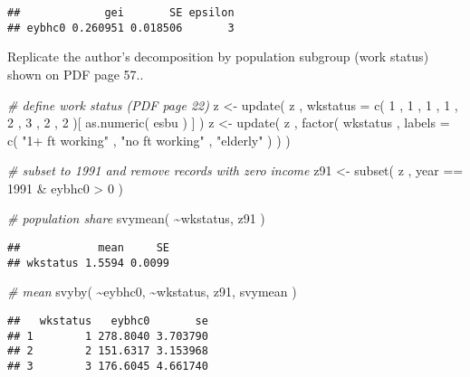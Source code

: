 \documentclass[
]{book}
\newenvironment{Shaded}{\begin{snugshade}}{\end{snugshade}}
\newcommand{\AttributeTok}[1]{\textcolor[rgb]{0.77,0.63,0.00}{#1}}
\newcommand{\CommentTok}[1]{\textcolor[rgb]{0.56,0.35,0.01}{\textit{#1}}}
\newcommand{\DecValTok}[1]{\textcolor[rgb]{0.00,0.00,0.81}{#1}}
\newcommand{\FunctionTok}[1]{\textcolor[rgb]{0.00,0.00,0.00}{#1}}
\newcommand{\NormalTok}[1]{#1}
\newcommand{\OtherTok}[1]{\textcolor[rgb]{0.56,0.35,0.01}{#1}}
\newcommand{\SpecialCharTok}[1]{\textcolor[rgb]{0.00,0.00,0.00}{#1}}
\newcommand{\StringTok}[1]{\textcolor[rgb]{0.31,0.60,0.02}{#1}}
\begin{document}
\begin{verbatim}
##             gei       SE epsilon
## eybhc0 0.260951 0.018506       3
\end{verbatim}

Replicate the author's decomposition by population subgroup (work status) shown on PDF page 57..

\begin{Shaded}
\begin{Highlighting}[]
\CommentTok{\# define work status (PDF page 22)}
\NormalTok{z }\OtherTok{\textless{}{-}} \FunctionTok{update}\NormalTok{( z , }\AttributeTok{wkstatus =} \FunctionTok{c}\NormalTok{( }\DecValTok{1}\NormalTok{ , }\DecValTok{1}\NormalTok{ , }\DecValTok{1}\NormalTok{ , }\DecValTok{1}\NormalTok{ , }\DecValTok{2}\NormalTok{ , }\DecValTok{3}\NormalTok{ , }\DecValTok{2}\NormalTok{ , }\DecValTok{2}\NormalTok{ )[ }\FunctionTok{as.numeric}\NormalTok{( esbu ) ] )}
\NormalTok{z }\OtherTok{\textless{}{-}} \FunctionTok{update}\NormalTok{( z , }\FunctionTok{factor}\NormalTok{( wkstatus , }\AttributeTok{labels =} \FunctionTok{c}\NormalTok{( }\StringTok{"1+ ft working"}\NormalTok{ , }\StringTok{"no ft working"}\NormalTok{ , }\StringTok{"elderly"}\NormalTok{ ) ) )}

\CommentTok{\# subset to 1991 and remove records with zero income}
\NormalTok{z91 }\OtherTok{\textless{}{-}} \FunctionTok{subset}\NormalTok{( z , year }\SpecialCharTok{==} \DecValTok{1991} \SpecialCharTok{\&}\NormalTok{ eybhc0 }\SpecialCharTok{\textgreater{}} \DecValTok{0}\NormalTok{ )}

\CommentTok{\# population share}
\FunctionTok{svymean}\NormalTok{( }\SpecialCharTok{\textasciitilde{}}\NormalTok{wkstatus, z91 )}
\end{Highlighting}
\end{Shaded}

\begin{verbatim}
##            mean     SE
## wkstatus 1.5594 0.0099
\end{verbatim}

\begin{Shaded}
\begin{Highlighting}[]
\CommentTok{\# mean}
\FunctionTok{svyby}\NormalTok{( }\SpecialCharTok{\textasciitilde{}}\NormalTok{eybhc0, }\SpecialCharTok{\textasciitilde{}}\NormalTok{wkstatus, z91, svymean )}
\end{Highlighting}
\end{Shaded}

\begin{verbatim}
##   wkstatus   eybhc0       se
## 1        1 278.8040 3.703790
## 2        2 151.6317 3.153968
## 3        3 176.6045 4.661740
\end{verbatim}
\end{document}
